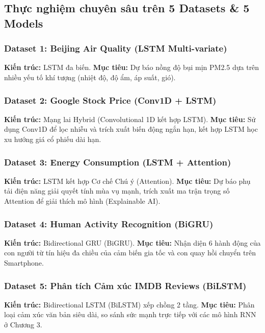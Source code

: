 \subsection{Thực nghiệm chuyên sâu trên 5 Datasets \& 5 Models}

\subsubsection{Dataset 1: Beijing Air Quality (LSTM Multi-variate)}
\textbf{Kiến trúc:} LSTM đa biến.
\textbf{Mục tiêu:} Dự báo nồng độ bụi mịn PM2.5 dựa trên nhiều yếu tố khí tượng (nhiệt độ, độ ẩm, áp suất, gió).


\subsubsection{Dataset 2: Google Stock Price (Conv1D + LSTM)}
\textbf{Kiến trúc:} Mạng lai Hybrid (Convolutional 1D kết hợp LSTM).
\textbf{Mục tiêu:} Sử dụng Conv1D để lọc nhiễu và trích xuất biến động ngắn hạn, kết hợp LSTM học xu hướng giá cổ phiếu dài hạn.


\subsubsection{Dataset 3: Energy Consumption (LSTM + Attention)}
\textbf{Kiến trúc:} LSTM kết hợp Cơ chế Chú ý (Attention).
\textbf{Mục tiêu:} Dự báo phụ tải điện năng giải quyết tính mùa vụ mạnh, trích xuất ma trận trọng số Attention để giải thích mô hình (Explainable AI).


\subsubsection{Dataset 4: Human Activity Recognition (BiGRU)}
\textbf{Kiến trúc:} Bidirectional GRU (BiGRU).
\textbf{Mục tiêu:} Nhận diện 6 hành động của con người từ tín hiệu đa chiều của cảm biến gia tốc và con quay hồi chuyển trên Smartphone.


\subsubsection{Dataset 5: Phân tích Cảm xúc IMDB Reviews (BiLSTM)}
\textbf{Kiến trúc:} Bidirectional LSTM (BiLSTM) xếp chồng 2 tầng.
\textbf{Mục tiêu:} Phân loại cảm xúc văn bản siêu dài, so sánh sức mạnh trực tiếp với các mô hình RNN ở Chương 3.


